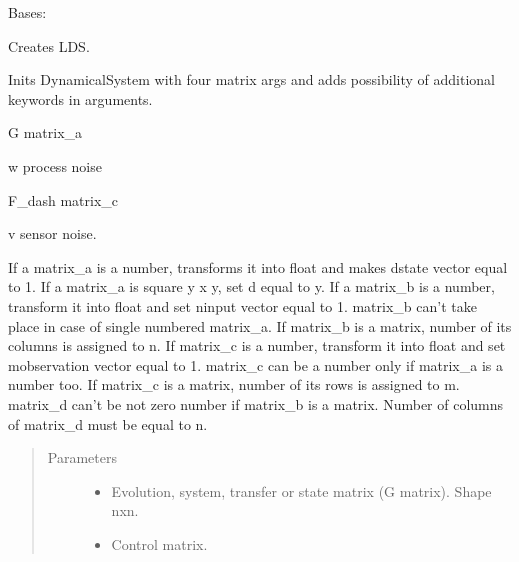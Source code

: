 \documentclass[letterpaper,10pt,english]{sphinxmanual}
\begin{document}
\begin{fulllineitems}
\label{\detokenize{LDS.LDS.ds:LDS.LDS.ds.dynamical_system.DynamicalSystem}}
\sphinxAtStartPar
Bases: 

\sphinxAtStartPar
Creates LDS.

\sphinxAtStartPar
Inits DynamicalSystem with four matrix args and
adds possibility of additional keywords in arguments.

\begin{DUlineblock}{0em}
\item[] G \sphinxhyphen{} matrix\_a
\item[] w \sphinxhyphen{} process noise
\item[] F\_dash \sphinxhyphen{} matrix\_c
\item[] v \sphinxhyphen{} sensor noise.
\end{DUlineblock}

\sphinxAtStartPar
If a matrix\_a is a number, transforms it into float
and makes d\sphinxhyphen{}state vector equal to 1.
If a matrix\_a is square y x y, set d equal to y.
If a matrix\_b is a number, transform it into float
and set n\sphinxhyphen{}input vector equal to 1.
matrix\_b can’t take place in case of single numbered
matrix\_a.
If matrix\_b is a matrix, number of its columns is assigned to n.
If matrix\_c is a number, transform it into float
and set m\sphinxhyphen{}observation vector equal to 1.
matrix\_c can be a number only if matrix\_a is a number too.
If matrix\_c is a matrix, number of its rows is assigned to m.
matrix\_d can’t be not zero number if matrix\_b is a matrix.
Number of columns of matrix\_d must be equal to n.
\begin{quote}\begin{description}
\item[{Parameters}] \leavevmode\begin{itemize}
\item {} 
\sphinxAtStartPar
{} \textendash{} Evolution, system, transfer or state matrix (G matrix).
Shape nxn.

\item {} 
\sphinxAtStartPar
{} \textendash{} Control matrix.


\end{itemize}
\end{description}
\end{quote}
\end{fulllineitems}
\end{document}
